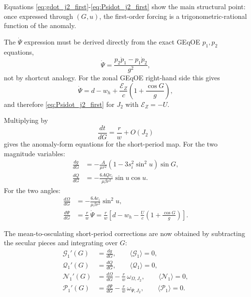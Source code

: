\documentclass[11pt]{article}
\begin{document}
Equations \eqref{eq:gdot_j2_first}-\eqref{eq:Psidot_j2_first} show the
main structural point: once expressed through $(G,u)$, the first-order forcing
is a trigonometric-rational function of the anomaly.

The $\dot\Psi$ expression must be derived directly from the exact GEqOE
$p_1,p_2$ equations,
\begin{equation}
\dot\Psi = \frac{p_2 \dot p_1 - p_1 \dot p_2}{g^2},
\end{equation}
not by shortcut analogy. For the zonal GEqOE right-hand side this gives
\begin{equation}
\dot\Psi = d - w_h + \frac{\mathcal E_Z}{c}
\left(1 + \frac{\cos G}{g}\right),
\end{equation}
and therefore \eqref{eq:Psidot_j2_first} for $J_2$ with
$\mathcal E_Z = -U$.

Multiplying by
\begin{equation}
\frac{dt}{dG} = \frac{r}{w} + O(J_2)
\end{equation}
gives the anomaly-form equations for the short-period map. For the two
magnitude variables:
\begin{align}
\frac{dg}{dG}
&= -\frac{A}{\mu r^2}
\left(1-3s_i^2\sin^2 u\right)\sin G,
\label{eq:dg_dG}\\
\frac{dQ}{dG}
&= -\frac{6A Q c_i}{\mu \beta r^2}\sin u \cos u.
\label{eq:dQ_dG}
\end{align}
For the two angles:
\begin{align}
\frac{d\Omega}{dG}
&= -\frac{6A c_i}{\mu \beta r^2}\sin^2 u,
\label{eq:dOmega_dG}\\
\frac{d\Psi}{dG}
&= \frac{r}{w}\,\dot\Psi
 = \frac{r}{w}
\left[
d - w_h - \frac{U}{c}\left(1 + \frac{\cos G}{g}\right)
\right].
\label{eq:dPsi_dG}
\end{align}

The mean-to-osculating short-period corrections are now obtained by subtracting
the secular pieces and integrating over $G$:
\begin{align}
\mathcal G_1'(G) &=
\frac{dg}{dG}, \qquad
\langle \mathcal G_1 \rangle = 0, \\
\mathcal Q_1'(G) &=
\frac{dQ}{dG}, \qquad
\langle \mathcal Q_1 \rangle = 0, \\
\mathcal N_1'(G) &=
\frac{d\Omega}{dG}
- \frac{r}{w}\,\omega_{\Omega,J_2},
\qquad
\langle \mathcal N_1 \rangle = 0, \\
\mathcal P_1'(G) &=
\frac{d\Psi}{dG}
- \frac{r}{w}\,\omega_{\Psi,J_2},
\qquad
\langle \mathcal P_1 \rangle = 0.
\label{eq:map_primes}
\end{align}
\end{document}
